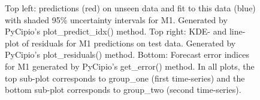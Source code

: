 \documentclass{article}
\begin{document}
\begin{figure}[H]
    \centering
    \quad
    \quad
    \caption{Top left: predictions (red) on unseen data and fit to this data (blue) with shaded 95\% uncertainty intervals for M1. Generated by PyCipio’s plot\_predict\_idx() method. Top right: KDE- and line-plot of residuals for M1 predictions on test data. Generated by PyCipio's plot\_residuals() method. Bottom: Forecast error indices for M1 generated by PyCipio's get\_error() method. In all plots, the top sub-plot corresponds to group\_one (first time-series) and the bottom sub-plot corresponds to group\_two (second time-series).}
\end{figure}
\end{document}
